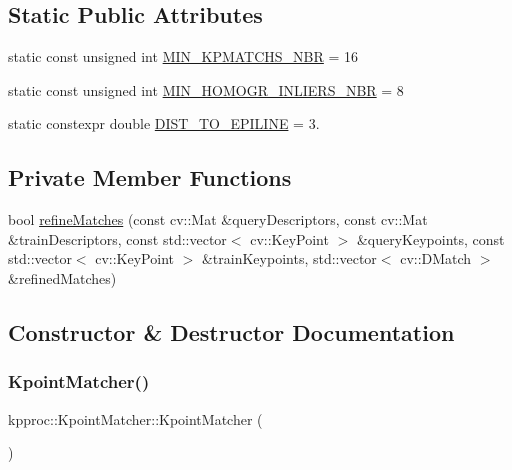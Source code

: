 \subsection*{Static Public Attributes}
\begin{DoxyCompactItemize}
\item 
static const unsigned int \hyperlink{classkpproc_1_1KpointMatcher_a35b716145fb33b20b3ca2bfec10e343e}{M\+I\+N\+\_\+\+K\+P\+M\+A\+T\+C\+H\+S\+\_\+\+N\+BR} = 16
\item 
static const unsigned int \hyperlink{classkpproc_1_1KpointMatcher_a4d0c0de93ab29378a504265e263663f6}{M\+I\+N\+\_\+\+H\+O\+M\+O\+G\+R\+\_\+\+I\+N\+L\+I\+E\+R\+S\+\_\+\+N\+BR} = 8
\item 
static constexpr double \hyperlink{classkpproc_1_1KpointMatcher_a1efd51083ded96127c34697340e5e92e}{D\+I\+S\+T\+\_\+\+T\+O\+\_\+\+E\+P\+I\+L\+I\+NE} = 3.
\end{DoxyCompactItemize}
\subsection*{Private Member Functions}
\begin{DoxyCompactItemize}
\item 
bool \hyperlink{classkpproc_1_1KpointMatcher_a0d1681f55cfeea8a51bba9ccac41d346}{refine\+Matches} (const cv\+::\+Mat \&query\+Descriptors, const cv\+::\+Mat \&train\+Descriptors, const std\+::vector$<$ cv\+::\+Key\+Point $>$ \&query\+Keypoints, const std\+::vector$<$ cv\+::\+Key\+Point $>$ \&train\+Keypoints, std\+::vector$<$ cv\+::\+D\+Match $>$ \&refined\+Matches)
\end{DoxyCompactItemize}


\subsection{Constructor \& Destructor Documentation}
\mbox{\label{classkpproc_1_1KpointMatcher_a4a40c73477a60c38e5f12ed6f204ab9a}} 
\subsubsection{\texorpdfstring{Kpoint\+Matcher()}{KpointMatcher()}}
{\footnotesize\ttfamily kpproc\+::\+Kpoint\+Matcher\+::\+Kpoint\+Matcher (\begin{DoxyParamCaption}{ }\end{DoxyParamCaption})\hspace{0.3cm}{\ttfamily [inline]}}

